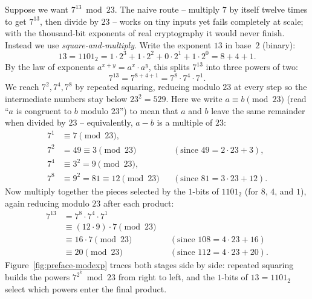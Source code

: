 Suppose we want $7^{13} \bmod 23$. The naive route -- multiply $7$ by itself twelve times to get $7^{13}$, then divide by $23$ -- works on tiny inputs yet fails completely at scale; with the thousand-bit exponents of real cryptography it would never finish. Instead we use \emph{square-and-multiply}. Write the exponent $13$ in base~$2$ (binary):
\[
  13 = 1101_2 = 1 \cdot 2^3 + 1 \cdot 2^2 + 0 \cdot 2^1 + 1 \cdot 2^0 = 8 + 4 + 1.
\]
By the law of exponents $a^{x+y} = a^x \cdot a^y$, this splits $7^{13}$ into three powers of two:
\[
  7^{13} = 7^{8 + 4 + 1} = 7^{8} \cdot 7^{4} \cdot 7^{1}.
\]
We reach $7^2, 7^4, 7^8$ by repeated squaring, reducing modulo $23$ at every step so the intermediate numbers stay below $23^2 = 529$. Here we write $a \equiv b \pmod{23}$ (read ``$a$ is congruent to $b$ modulo $23$'') to mean that $a$ and $b$ leave the same remainder when divided by $23$ -- equivalently, $a - b$ is a multiple of $23$:
\begin{align*}
  7^{1} &\equiv 7 \pmod{23}, \\
  7^{2} &= 49 \equiv 3 \pmod{23} && (\text{since } 49 = 2 \cdot 23 + 3), \\
  7^{4} &\equiv 3^{2} = 9 \pmod{23}, \\
  7^{8} &\equiv 9^{2} = 81 \equiv 12 \pmod{23} && (\text{since } 81 = 3 \cdot 23 + 12).
\end{align*}
Now multiply together the pieces selected by the $1$-bits of $1101_2$ (for $8$, $4$, and $1$), again reducing modulo $23$ after each product:
\begin{align*}
  7^{13} &= 7^{8} \cdot 7^{4} \cdot 7^{1} \\
  &\equiv (12 \cdot 9) \cdot 7 \pmod{23} \\
  &\equiv 16 \cdot 7 \pmod{23} && (\text{since } 108 = 4 \cdot 23 + 16) \\
  &\equiv 20 \pmod{23} && (\text{since } 112 = 4 \cdot 23 + 20).
\end{align*}
Figure~\ref{fig:preface-modexp} traces both stages side by side: repeated squaring builds the powers $7^{2^k} \bmod 23$ from right to left, and the $1$-bits of $13 = 1101_2$ select which powers enter the final product.

